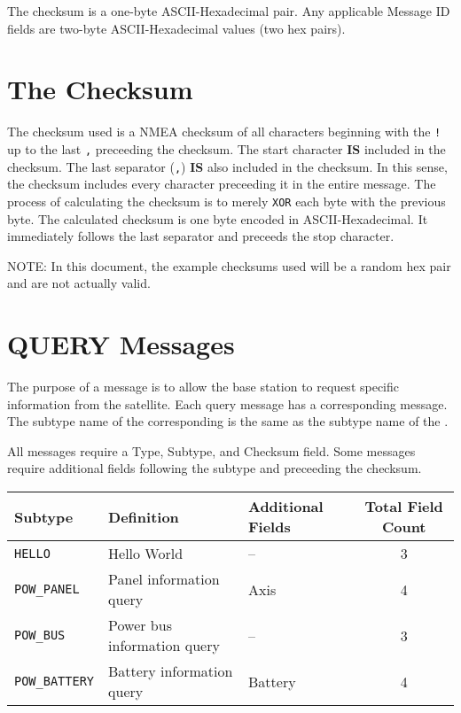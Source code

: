 \documentclass{article}
\begin{document}
  The checksum is a one-byte ASCII-Hexadecimal pair. Any applicable Message ID fields are two-byte ASCII-Hexadecimal values (two hex pairs).
  
\section{The Checksum}
  The checksum used is a NMEA checksum of all characters beginning with the \texttt{!} up to the last \texttt{,} preceeding the checksum.
  The start character \textbf{IS} included in the checksum. The last separator (\texttt{,}) \textbf{IS} also included in the checksum. In
  this sense, the checksum includes every character preceeding it in the entire message.
  The process of calculating the checksum is to merely \texttt{XOR} each byte with the previous byte.
  The calculated checksum is one byte encoded in ASCII-Hexadecimal. It immediately follows the last separator and preceeds the stop character.
  
  
  \large NOTE: \normalsize In this document, the example checksums used will be a random hex pair and are not actually valid.
\section{QUERY Messages}
  The purpose of a \mquery message is to allow the base station to request specific information from the satellite.
  Each query message has a corresponding \mresult message. The subtype name of the corresponding \mresult
  is the same as the subtype name of the \mquery.
  
  All \mquery messages require a Type, Subtype, and Checksum field. Some messages require additional fields following
  the subtype and preceeding the checksum.
  \begin{center}
    \begin{tabular}{| l | l | l | c |}
      \hline
      Subtype & Definition & Additional Fields & Total Field Count \\ \hline
      \texttt{HELLO} & Hello World & -- & 3 \\
      \texttt{POW\_PANEL} & Panel information query & Axis & 4 \\
      \texttt{POW\_BUS} & Power bus information query & -- & 3 \\
      \texttt{POW\_BATTERY} & Battery information query &  Battery & 4 \\
      \hline
    \end{tabular}
  \end{center}
  
\end{document}
